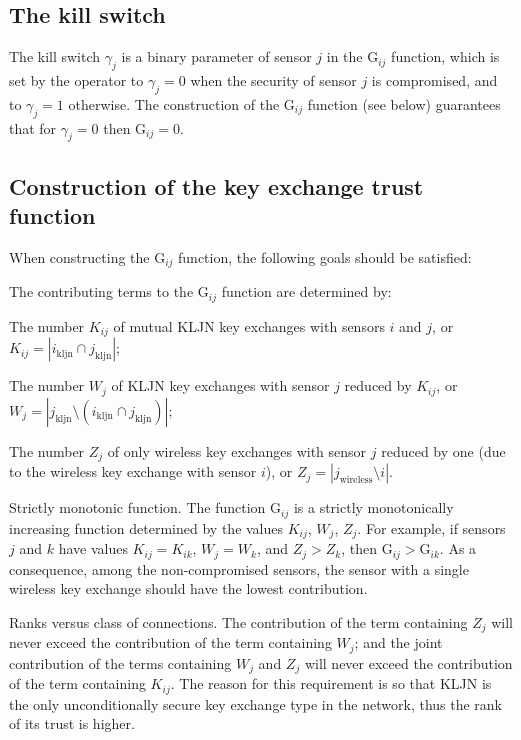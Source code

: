 \documentclass{ws-fnl2}
\begin{document}
\subsection{The kill switch}

The kill switch $\gamma_j$ is a binary parameter of sensor $j$ in the G$_{ij}$ function, which is set by the operator to $\gamma_j=0$ when the security of sensor $j$ is compromised, and to $\gamma_j=1$ otherwise. The construction of the G$_{ij}$ function (see below) guarantees that for $\gamma_j=0$ then G$_{ij}=0$.

\subsection{Construction of the key exchange trust function}

When constructing the G$_{ij}$ function, the following goals should be satisfied:

\begin{romanlist}[(ii)]
 \item The contributing terms to the G$_{ij}$ function are determined by:
 \begin{romanlist}[(b)]
  \item The number $K_{ij}$ of mutual KLJN key exchanges with sensors $i$ and $j$, or $K_{ij} = |i_{\mathrm{kljn}} \cap j_{\mathrm{kljn}}|$;
  \item The number $W_{j}$ of KLJN key exchanges with sensor $j$ reduced by $K_{ij}$,  or \\ $W_j=|j_{\mathrm{kljn}} \setminus (i_{\mathrm{kljn}} \cap j_{\mathrm{kljn}})|$;
  \item The number $Z_{j}$ of only wireless key exchanges with sensor $j$ reduced by one (due to the wireless key exchange with sensor $i$), or $Z_j=|j_{\mathrm{wireless}} \setminus i|$.
 \end{romanlist}
 \item Strictly monotonic function. The function G$_{ij}$ is a strictly monotonically increasing function determined by the values $K_{ij}$, $W_j$, $Z_j$. For example, if sensors $j$ and $k$ have values $K_{ij}=K_{ik}$, $W_j=W_k$, and $Z_j > Z_k$, then $\mathrm{G}_{ij} > \mathrm{G}_{ik}$. As a consequence, among the non-compromised sensors, the sensor with a single wireless key exchange should have the lowest contribution.
 
 \item Ranks versus class of connections. The contribution of the term containing $Z_j$ will never exceed the contribution of the term containing $W_j$; and the joint contribution of the terms containing $W_j$ and $Z_j$ will never exceed the contribution of the term containing $K_{ij}$. The reason for this requirement is so that KLJN is the only unconditionally secure key exchange type in the network, thus the rank of its trust is higher. 
\end{romanlist}
\end{document}
